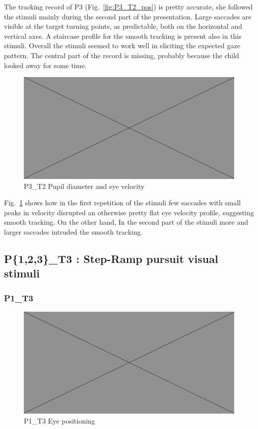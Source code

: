 The tracking record of P3 (Fig.~\ref{fig:P3_T2_pos}) is pretty accurate, she followed the stimuli mainly during the second part of the presentation. Large saccades are visible at the target turning points, as predictable, both on the horizontal and vertical axes. A staircase profile for the smooth tracking is present also in this stimuli. Overall the stimuli seemed to work  well in eliciting the expected gaze pattern. The central part of the record is missing, probably because the child looked away for some time.

\begin{figure}[h]
  \centering
  \includegraphics[width=.5\textwidth]{figures/placeholderImg.jpg}
  \caption[P3\_T2 pupil velocity]{P3\_T2 Pupil diameter and eye velocity}
  \label{fig:P3_T2_vel}
\end{figure}

Fig.~\ref{fig:P3_T2_vel} shows how in the first repetition of the stimuli few saccades with small peaks in velocity disrupted an otherwise pretty flat eye velocity profile, suggesting smooth tracking. On the other hand, In the second part of the stimuli more and larger saccades intruded the smooth tracking.


\subsection{P\{1,2,3\}\_T3 : Step-Ramp pursuit visual stimuli}
\label{sec:P123_T2}

\subsubsection{P1\_T3}
\label{sec:P1_T3}

\begin{figure}[h]
  \centering
  \includegraphics[width=.5\textwidth]{figures/placeholderImg.jpg}
  \caption[P1\_T3 Eye positioning]{P1\_T3 Eye positioning}
  \label{fig:P1_T3_pos}
\end{figure}

